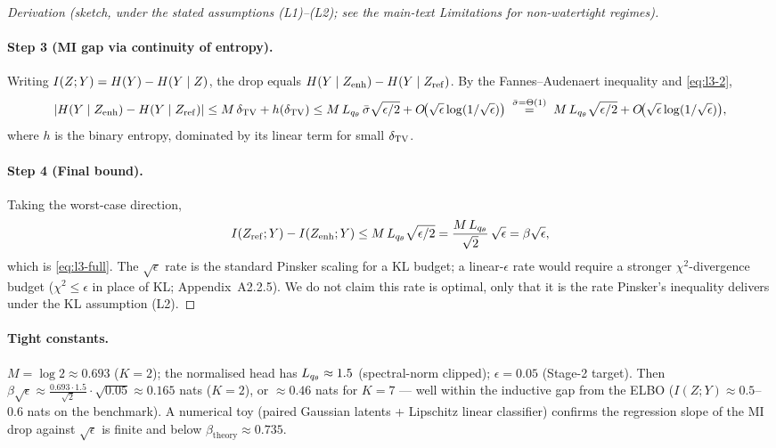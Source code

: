 \begin{proof}[Derivation (sketch, under the stated assumptions (L1)--(L2); see the main-text
Limitations for non-watertight regimes)]
\paragraph{Step 3 (MI gap via continuity of entropy).}
Writing $I(Z;Y)=H(Y)-H(Y\mid Z)$, the drop equals
$H(Y\mid Z_{\mathrm{enh}})-H(Y\mid Z_{\mathrm{ref}})$. By the Fannes--Audenaert inequality and
\eqref{eq:l3-2},
\begin{equation}
|H(Y\mid Z_{\mathrm{enh}})-H(Y\mid Z_{\mathrm{ref}})|
\leq M\,\delta_{\mathrm{TV}} + h(\delta_{\mathrm{TV}})
\leq M\,L_{q_\theta}\,\bar{\sigma}\sqrt{\epsilon/2} + O\!\big(\sqrt{\epsilon}\log(1/\sqrt{\epsilon})\big)
\;\stackrel{\bar{\sigma}=\Theta(1)}{=}\; M\,L_{q_\theta}\sqrt{\epsilon/2} + O\!\big(\sqrt{\epsilon}\log(1/\sqrt{\epsilon})\big),
\label{eq:l3-3}
\end{equation}
where $h$ is the binary entropy, dominated by its linear term for small $\delta_{\mathrm{TV}}$.

\paragraph{Step 4 (Final bound).}
Taking the worst-case direction,
\begin{equation}
I(Z_{\mathrm{ref}};Y)-I(Z_{\mathrm{enh}};Y)
\leq M\,L_{q_\theta}\sqrt{\epsilon/2}
= \frac{M\,L_{q_\theta}}{\sqrt{2}}\,\sqrt{\epsilon} = \beta\sqrt{\epsilon},
\label{eq:l3-4}
\end{equation}
which is \eqref{eq:l3-full}. The $\sqrt{\epsilon}$ rate is the standard Pinsker scaling for a
KL budget; a linear-$\epsilon$ rate would require a stronger $\chi^2$-divergence budget
($\chi^2\leq\epsilon$ in place of KL; Appendix~A2.2.5). We do not claim this rate is optimal,
only that it is the rate Pinsker's inequality delivers under the KL assumption (L2).
\end{proof}

\paragraph{Tight constants.}
$M=\log 2\approx 0.693$ ($K=2$); the normalised \qvib{} head has $L_{q_\theta}\approx 1.5$
(spectral-norm clipped); $\epsilon=0.05$ (Stage-2 target). Then
$\beta\sqrt{\epsilon}\approx \tfrac{0.693\cdot 1.5}{\sqrt{2}}\cdot\sqrt{0.05}\approx 0.165$ nats
($K=2$), or $\approx 0.46$ nats for $K=7$ --- well within the inductive gap from the \qvib{}
ELBO ($I(Z;Y)\approx 0.5$--$0.6$ nats on the benchmark). A numerical toy
(paired Gaussian latents + Lipschitz linear classifier) confirms the regression slope of
the MI drop against $\sqrt{\epsilon}$ is finite and below $\beta_{\mathrm{theory}}\approx 0.735$.
